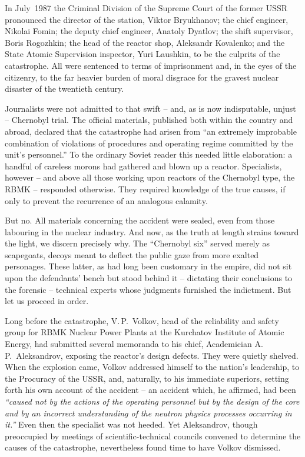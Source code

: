 \documentclass[openright]{bookest}
\begin{document}
In July~1987 the Criminal Division of the Supreme Court of the former USSR pronounced the director of the station, Viktor Bryukhanov; the chief engineer, Nikolai Fomin; the deputy chief engineer, Anatoly Dyatlov; the shift supervisor, Boris Rogozhkin; the head of the reactor shop, Aleksandr Kovalenko; and the State Atomic Supervision inspector, Yuri Laushkin, to be the culprits of the catastrophe. All were sentenced to terms of imprisonment and, in the eyes of the citizenry, to the far heavier burden of moral disgrace for the gravest nuclear disaster of the twentieth century.

Journalists were not admitted to that swift -- and, as is now indisputable, unjust -- Chernobyl trial. The official materials, published both within the country and abroad, declared that the catastrophe had arisen from ``an extremely improbable combination of violations of procedures and operating regime committed by the unit's personnel.'' To the ordinary Soviet reader this needed little elaboration: a handful of careless morons had gathered and blown up a reactor. Specialists, however -- and above all those working upon reactors of the Chernobyl type, the RBMK -- responded otherwise. They required knowledge of the true causes, if only to prevent the recurrence of an analogous calamity.

But no. All materials concerning the accident were sealed, even from those labouring in the nuclear industry. And now, as the truth at length strains toward the light, we discern precisely why. The ``Chernobyl six'' served merely as scapegoats, decoys meant to deflect the public gaze from more exalted personages. These latter, as had long been customary in the empire, did not sit upon the defendants' bench but stood behind it -- dictating their conclusions to the forensic -- technical experts whose judgments furnished the indictment. But let us proceed in order.

Long before the catastrophe, V.\,P.~Volkov, head of the reliability and safety group for RBMK Nuclear Power Plants at the Kurchatov Institute of Atomic Energy, had submitted several memoranda to his chief, Academician A.\,P.~Aleksandrov, exposing the reactor's design defects. They were quietly shelved. When the explosion came, Volkov addressed himself to the nation's leadership, to the Procuracy of the USSR, and, naturally, to his immediate superiors, setting forth his own account of the accident -- an accident which, he affirmed, had been \textit{``caused not by the actions of the operating personnel but by the design of the core and by an incorrect understanding of the neutron physics processes occurring in it.''} Even then the specialist was not heeded. Yet Aleksandrov, though preoccupied by meetings of scientific-technical councils convened to determine the causes of the catastrophe, nevertheless found time to have Volkov dismissed.
\end{document}
